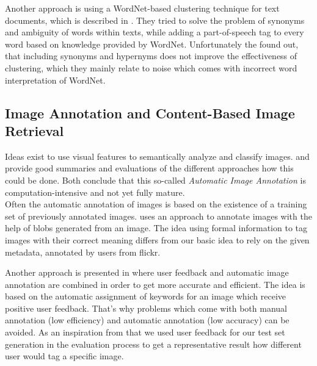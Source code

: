 Another approach is using a WordNet-based clustering technique for text documents, which is described in \cite{sedding2004wordnet}.  They tried to solve the problem of synonyms and ambiguity of words within texts, while adding a part-of-speech tag to every word based on knowledge provided by WordNet. Unfortunately the found out, that including synonyms and hypernyms does not improve the effectiveness of clustering, which they mainly relate to noise which comes with incorrect word interpretation of WordNet. 

\subsection{Image Annotation and Content-Based Image Retrieval}

Ideas exist to use visual features to semantically analyze and classify images. \cite{Liu2007} and \cite{Zhang2012} provide good summaries and evaluations of the different approaches how this could be done. Both conclude that this so-called \emph{Automatic Image Annotation}  is computation-intensive and not yet fully mature. \\
Often the automatic annotation of images is based on the existence of a training set of previously annotated images.  \cite{jeon2003automatic}	uses an approach to annotate images with the help of blobs generated from an image. The idea using formal information to tag images with their correct meaning differs from our basic idea to rely on the given metadata, annotated by users from flickr.

\bigskip

Another approach is presented in \cite{wenyin2001semi} where user feedback and automatic image annotation are combined in order to get more accurate and efficient. The idea is based on the automatic assignment of keywords for an image which receive positive user feedback. That's why problems which come with both manual annotation (low efficiency) and automatic annotation (low accuracy) can be avoided. As an inspiration from that we used user feedback for our test set generation in the evaluation process to get a representative result how different user would tag a specific image.
	
\bigskip

